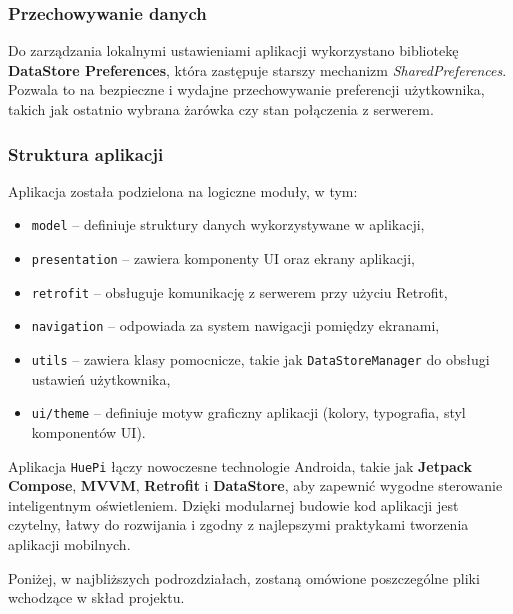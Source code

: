 \documentclass[12pt]{article}
\begin{document}
\subsubsection*{Przechowywanie danych}
Do zarządzania lokalnymi ustawieniami aplikacji wykorzystano bibliotekę \textbf{DataStore Preferences}, która zastępuje starszy mechanizm \textit{SharedPreferences}.
Pozwala to na bezpieczne i wydajne przechowywanie preferencji użytkownika, takich jak ostatnio wybrana żarówka czy stan połączenia z serwerem.

\subsubsection*{Struktura aplikacji}
\noindent Aplikacja została podzielona na logiczne moduły, w tym:
\begin{itemize}
    \item \texttt{model} – definiuje struktury danych wykorzystywane w aplikacji,
    \item \texttt{presentation} – zawiera komponenty UI oraz ekrany aplikacji,
    \item \texttt{retrofit} – obsługuje komunikację z serwerem przy użyciu Retrofit,
    \item \texttt{navigation} – odpowiada za system nawigacji pomiędzy ekranami,
    \item \texttt{utils} – zawiera klasy pomocnicze, takie jak \texttt{DataStoreManager} do obsługi ustawień użytkownika,
    \item \texttt{ui/theme} – definiuje motyw graficzny aplikacji (kolory, typografia, styl komponentów UI).
\end{itemize}
Aplikacja \texttt{HuePi} łączy nowoczesne technologie Androida, takie jak \textbf{Jetpack Compose}, \textbf{MVVM}, \textbf{Retrofit} i \textbf{DataStore}, aby zapewnić wygodne
sterowanie inteligentnym oświetleniem. Dzięki modularnej budowie kod aplikacji jest czytelny, łatwy do rozwijania i zgodny z najlepszymi praktykami tworzenia aplikacji mobilnych.

\vspace{\baselineskip}
\noindent Poniżej, w najbliższych podrozdziałach, zostaną omówione poszczególne pliki wchodzące w skład projektu.
\clearpage
\end{document}
